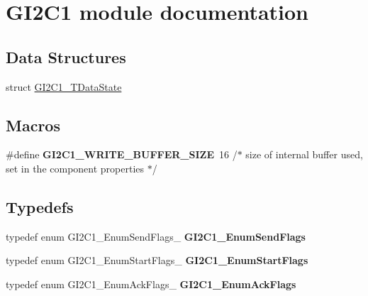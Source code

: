 \hypertarget{group___g_i2_c1__module}{\section{G\-I2\-C1 module documentation}
\label{group___g_i2_c1__module}
}
\subsection*{Data Structures}
\begin{DoxyCompactItemize}
\item 
struct \hyperlink{struct_g_i2_c1___t_data_state}{G\-I2\-C1\-\_\-\-T\-Data\-State}
\end{DoxyCompactItemize}
\subsection*{Macros}
\begin{DoxyCompactItemize}
\item 
\hypertarget{group___g_i2_c1__module_ga397b9a2812876e9f51ccb0680978f7b6}{\#define {\bfseries G\-I2\-C1\-\_\-\-W\-R\-I\-T\-E\-\_\-\-B\-U\-F\-F\-E\-R\-\_\-\-S\-I\-Z\-E}~16 /$\ast$ size of internal buffer used, set in the component properties $\ast$/}\label{group___g_i2_c1__module_ga397b9a2812876e9f51ccb0680978f7b6}

\end{DoxyCompactItemize}
\subsection*{Typedefs}
\begin{DoxyCompactItemize}
\item 
\hypertarget{group___g_i2_c1__module_ga38aa8b988c043b512be82c8bb565224b}{typedef enum G\-I2\-C1\-\_\-\-Enum\-Send\-Flags\-\_\- {\bfseries G\-I2\-C1\-\_\-\-Enum\-Send\-Flags}}\label{group___g_i2_c1__module_ga38aa8b988c043b512be82c8bb565224b}

\item 
\hypertarget{group___g_i2_c1__module_ga82cfd799a9ecb5b62980b85fb3281e4b}{typedef enum G\-I2\-C1\-\_\-\-Enum\-Start\-Flags\-\_\- {\bfseries G\-I2\-C1\-\_\-\-Enum\-Start\-Flags}}\label{group___g_i2_c1__module_ga82cfd799a9ecb5b62980b85fb3281e4b}

\item 
\hypertarget{group___g_i2_c1__module_ga5bba94bfa7c6d717e1ead70d89eeb9da}{typedef enum G\-I2\-C1\-\_\-\-Enum\-Ack\-Flags\-\_\- {\bfseries G\-I2\-C1\-\_\-\-Enum\-Ack\-Flags}}\label{group___g_i2_c1__module_ga5bba94bfa7c6d717e1ead70d89eeb9da}

\end{DoxyCompactItemize}
